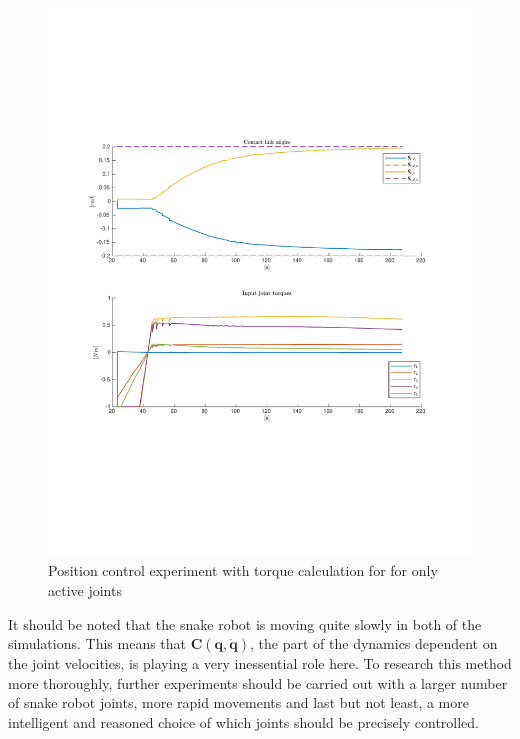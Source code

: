 \begin{figure}[H]
    \centering
    \includegraphics[trim=2.1cm 6cm 2.1cm 6cm, clip=true, width=\textwidth]{figures/experiments/2xpos/2xpos-2plot.pdf}
    \caption{Position control experiment with torque calculation for for only active joints}
    \label{fig:2xp-2}
\end{figure}

It should be noted that the snake robot is moving quite slowly in both of the simulations. This means that $\mathbf{C(q,\dot{q})}$, the part of the dynamics dependent on the joint velocities, is playing a very inessential role here. To research this method more thoroughly, further experiments should be carried out with a larger number of snake robot joints, more rapid movements and last but not least, a more intelligent and reasoned choice of which joints should be precisely controlled.